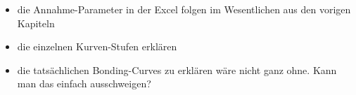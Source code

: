 
\vspace{0.5cm}

\vspace{0.5cm}


\begin{itemize}
	\item die Annahme-Parameter in der Excel folgen im Wesentlichen aus den vorigen Kapiteln
	\item die einzelnen Kurven-Stufen erklären
	\item die tatsächlichen Bonding-Curves zu erklären wäre nicht ganz ohne. Kann man das einfach ausschweigen?
\end{itemize}

\vspace{0.5cm}


